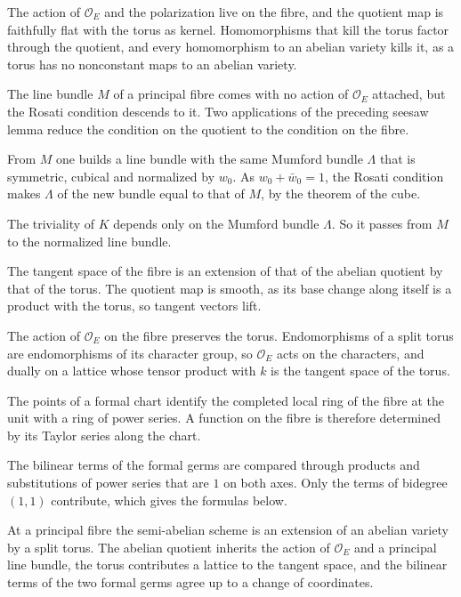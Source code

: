 The action of $\mathcal O_E$ and the polarization live on the fibre, and the quotient map is faithfully flat
with the torus as kernel. Homomorphisms that kill the torus factor through the quotient, and every
homomorphism to an abelian variety kills it, as a torus has no nonconstant maps to an abelian variety.

The line bundle $M$ of a principal fibre comes with no action of $\mathcal O_E$ attached, but the Rosati
condition descends to it. Two applications of the preceding seesaw lemma reduce the condition on the
quotient to the condition on the fibre.

From $M$ one builds a line bundle with the same Mumford bundle $\Lambda$ that is symmetric, cubical and
normalized by $w_0$. As $w_0+\bar w_0=1$, the Rosati condition makes $\Lambda$ of the new bundle equal to
that of $M$, by the theorem of the cube.

The triviality of $K$ depends only on the Mumford bundle $\Lambda$. So it passes from $M$ to the normalized
line bundle.

The tangent space of the fibre is an extension of that of the abelian quotient by that of the torus. The
quotient map is smooth, as its base change along itself is a product with the torus, so tangent vectors
lift.

The action of $\mathcal O_E$ on the fibre preserves the torus. Endomorphisms of a split torus are
endomorphisms of its character group, so $\mathcal O_E$ acts on the characters, and dually on a lattice
whose tensor product with $k$ is the tangent space of the torus.

The points of a formal chart identify the completed local ring of the fibre at the unit with a ring of
power series. A function on the fibre is therefore determined by its Taylor series along the chart.

The bilinear terms of the formal germs are compared through products and substitutions of power series
that are $1$ on both axes. Only the terms of bidegree $(1,1)$ contribute, which gives the formulas below.

At a principal fibre the semi-abelian scheme is an extension of an abelian variety by a split torus. The
abelian quotient inherits the action of $\mathcal O_E$ and a principal line bundle, the torus contributes
a lattice to the tangent space, and the bilinear terms of the two formal germs agree up to a change of
coordinates.

